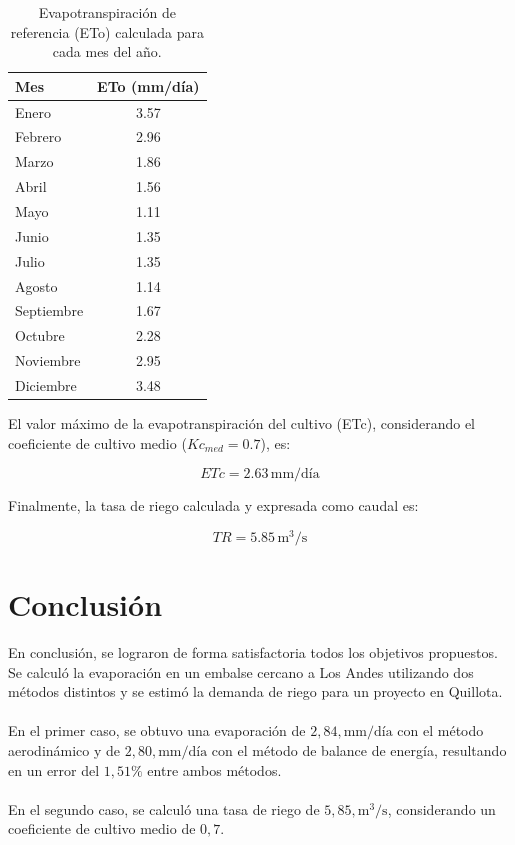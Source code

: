 \documentclass{article}  %
\begin{document}
\begin{table}[H]
\centering
\begin{tabular}{|l|c|}
\hline
\textbf{Mes} & \textbf{ETo (mm/día)} \\ \hline
Enero        & 3.57                  \\ \hline
Febrero      & 2.96                  \\ \hline
Marzo        & 1.86                  \\ \hline
Abril        & 1.56                  \\ \hline
Mayo         & 1.11                  \\ \hline
Junio        & 1.35                  \\ \hline
Julio        & 1.35                  \\ \hline
Agosto       & 1.14                  \\ \hline
Septiembre   & 1.67                  \\ \hline
Octubre      & 2.28                  \\ \hline
Noviembre    & 2.95                  \\ \hline
Diciembre    & 3.48                  \\ \hline
\end{tabular}
\caption{Evapotranspiración de referencia (ETo) calculada para cada mes del año.}
\end{table}

El valor máximo de la evapotranspiración del cultivo (ETc), considerando el coeficiente de cultivo medio ($Kc_{med} = 0.7$), es:

\begin{equation}
ETc = 2.63 \, \text{mm/día}
\end{equation}

Finalmente, la tasa de riego calculada y expresada como caudal es:

\begin{equation}
TR = 5.85 \, \text{m}^3/\text{s}
\end{equation}

\newpage
\section{Conclusión}

En conclusión, se lograron de forma satisfactoria todos los objetivos propuestos. Se calculó la evaporación en un embalse cercano a Los Andes utilizando dos métodos distintos y se estimó la demanda de riego para un proyecto en Quillota.
\\ \\
En el primer caso, se obtuvo una evaporación de $2,84 , \text{mm/día}$ con el método aerodinámico y de $2,80 , \text{mm/día}$ con el método de balance de energía, resultando en un error del $1,51 \%$ entre ambos métodos.
\\ \\
En el segundo caso, se calculó una tasa de riego de $5,85 , \text{m}^3/\text{s}$, considerando un coeficiente de cultivo medio de $0,7$.
\end{document}
